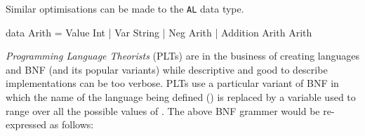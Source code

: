 Similar optimisations can be made to the \texttt{AL} data type.

\begin{code}
data Arith = Value Int | Var String | Neg Arith | Addition Arith Arith
\end{code}

\emph{Programming Language Theorists} (PLTs) are in the business of creating languages and BNF (and its popular variants) while descriptive and good to describe implementations can be too verbose.
PLTs use a particular variant of BNF in which the name of the language being defined (\allang{}) is replaced by a variable used to range over all the possible values of \allang{}.
The above BNF grammer would be re-expressed as follows:

\begin{bnf}
\end{bnf}

